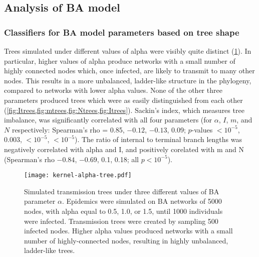 \subsection{Analysis of \acrlong{BA} model}



\subsubsection*{Classifiers for BA model parameters based on tree shape}



Trees simulated under different values of \gls{alpha} were visibly quite
distinct (\cref{fig:alphatrees}). In particular, higher values of \gls{alpha}
produce networks with a small number of highly connected nodes which, once
infected, are likely to transmit to many other nodes. This results in a more
unbalanced, ladder-like structure in the phylogeny, compared to networks with
lower \gls{alpha} values. None of the other three parameters produced trees
which were as easily distinguished from each other
(\cref{fig:Itrees,fig:mtrees,fig:Ntrees,fig:Itrees}).  Sackin's index, which
measures tree imbalance, was significantly correlated with all four parameters
    (for $\alpha$, $I$, $m$, and $N$ respectively: Spearman's rho =
     0.85,
     \ensuremath{-0.12},
     \ensuremath{-0.13},
     0.09;
     $p$-values
     ${<}10^{-5}$,
     $0.003$,
     ${<}10^{-5}$,
     ${<}10^{-5}$).
The ratio of internal to terminal branch lengths was negatively correlated with
\gls{alpha} and \gls{I}, and positively corelated with \gls{m} and \gls{N}
  (Spearman's rho
    \ensuremath{-0.84},
    \ensuremath{-0.69},
    0.1,
    0.18;
  all $p < 10^{-5}$).

\begin{figure}[ht]
  \centering
  \texttt{[image: kernel-alpha-tree.pdf]}
  \caption[Simulated transmission trees under three different values of BA parameter $\alpha$]{
    Simulated transmission trees under three different values of BA parameter
    $\alpha$. Epidemics were simulated on \gls{BA} networks of 5000 nodes, with
    \gls{alpha} equal to 0.5, 1.0, or 1.5, until 1000 individuals were
    infected. Transmission trees were created by sampling 500 infected nodes.
    Higher \gls{alpha} values produced networks with a small number of
    highly-connected nodes, resulting in highly unbalanced, ladder-like trees.
  }
  \label{fig:alphatrees}
\end{figure}

